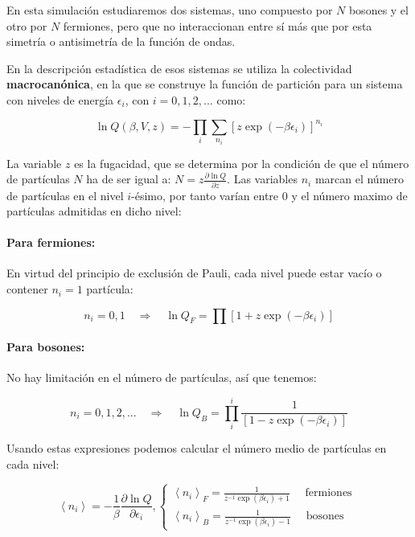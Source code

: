 \documentclass[11pt, a4paper]{article} %
\theoremstyle{named}
\begin{document}
        En esta simulación estudiaremos dos sistemas, uno compuesto por $N$ bosones y el otro por $N$ fermiones, pero que no interaccionan entre sí más que por esta simetría o antisimetría de la función de ondas.

        En la descripción estadística de esos sistemas se utiliza la colectividad \textbf{macrocanónica}, en la que se construye la función de partición para un sistema con niveles de energía $\epsilon_i$, con $i=0,1,2,...$ como:

        $$
        \ln Q(\beta,V,z) = -\prod_i \sum_{n_i}[z \exp (-\beta \epsilon_i)]^{n_i}
        $$

        La variable $z$ es la fugacidad, que se determina por la condición de que el número de partículas $N$ ha de ser igual a: $N=z \frac{\partial \ln Q}{\partial z}$. Las variables $n_i$ marcan el número de partículas en el nivel $i$-ésimo, por tanto varían entre $0$ y el número maximo de partículas admitidas en dicho nivel:

        \paragraph{Para fermiones:} En virtud del principio de exclusión de Pauli, cada nivel puede estar vacío o contener $n_i = 1$ partícula:

        $$
        n_{i}=0,1 \quad \Longrightarrow \quad \ln Q_{F} = \prod\left[1+z \exp \left(-\beta \epsilon_{i}\right)\right]
        $$

        \paragraph{Para bosones:} No hay limitación en el número de partículas, así que tenemos:

        $$
        n_{i}=0,1,2, ... \quad \Longrightarrow \quad \ln Q_{B} =\prod_{i}^{i} \frac{1}{\left[1-z \exp \left(-\beta \epsilon_{i}\right)\right]}
        $$

        Usando estas expresiones podemos calcular el número medio de partículas en cada nivel:

        \begin{equation}
        \left\langle n_{i}\right\rangle=-\frac{1}{\beta} \frac{\partial \ln Q}{\partial \epsilon_{i}},
        \left\{\begin{array}{l}{\left\langle n_{i}\right\rangle_{F}=\frac{1}{z^{-1} \exp \left(\beta \epsilon_{i}\right)+1} \quad \text { fermiones }} \\ {\left\langle n_{i}\right\rangle_{B}=\frac{1}{z^{-1} \exp \left(\beta \epsilon_{i}\right)-1} \quad \text { bosones }}\end{array}\right.
        \end{equation}
\end{document}
